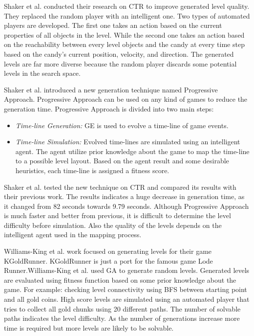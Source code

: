\documentclass[letterpaper]{article}
\begin{document}
Shaker et al.\cite{ctrSimulationApproach} conducted their research on CTR to improve generated level quality. They replaced the random player with an intelligent one. Two types of automated players are developed. The first one takes an action based on the current properties of all objects in the level. While the second one takes an action based on the reachability between every level objects and the candy at every time step based on the candy's current position, velocity, and direction. The generated levels are far more diverse because the random player discards some potential levels in the search space.\\\par

Shaker et al.\cite{ctrProgressiveApproach} introduced a new generation technique named Progressive Approach. Progressive Approach can be used on any kind of games to reduce the generation time. Progressive Approach is divided into two main steps:
\begin{itemize}
	\item \emph{Time-line Generation:} GE is used to evolve a time-line of game events.
	\item \emph{Time-line Simulation:} Evolved time-lines are simulated using an intelligent agent. The agent utilize prior knowledge about the game to map the time-line to a possible level layout. Based on the agent result and some desirable heuristics, each time-line is assigned a fitness score.
\end{itemize}
Shaker et al. tested the new technique on CTR and compared its results with their previous work\cite{ctrSimulationApproach}. The results indicates a huge decrease in generation time, as it changed from 82 seconds towards 9.79 seconds. Although Progressive Approach is much faster and better from previous, it is difficult to determine the level difficulty before simulation. Also the quality of the levels depends on the intelligent agent used in the mapping process.\\\par

Williams-King et al.\cite{kgrAutomaticGeneration} work focused on generating levels for their game KGoldRunner. KGoldRunner is just a port for the famous game Lode Runner\cite{lodeRunner}.Williams-King et al. used GA to generate random levels. Generated levels are evaluated using fitness function based on some prior knowledge about the game. For example: checking level connectivity using BFS between starting point and all gold coins. High score levels are simulated using an automated player that tries to collect all gold chunks using 20 different paths. The number of solvable paths indicates the level difficulty. As the number of generations increase more time is required but more levels are likely to be solvable.\\\par
\end{document}
